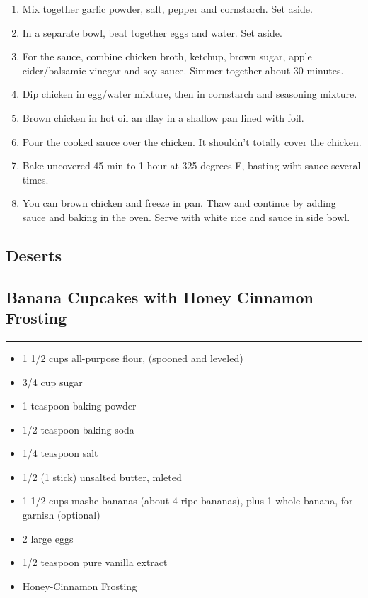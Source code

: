 \documentclass{article}
\begin{document}
\begin{enumerate}
    \item 
        Mix together garlic powder, salt, pepper and cornstarch. Set aside.
    \item 
        In a separate bowl, beat together eggs and water. Set aside.
    \item  
        For the sauce, combine chicken broth, ketchup, brown sugar, apple cider/balsamic vinegar and soy sauce. Simmer together about 30 minutes.
    \item 
        Dip chicken in egg/water mixture, then in cornstarch and seasoning mixture.
    \item 
        Brown chicken in hot oil an dlay in a shallow pan lined with foil.
    \item 
        Pour the cooked sauce over the chicken. It shouldn't totally cover the chicken.
    \item 
        Bake uncovered 45 min to 1 hour at 325 degrees F, basting wiht sauce several times.
    \item 
        You can brown chicken and freeze in pan. Thaw and continue by adding sauce and baking in the oven. Serve with white rice and sauce in side bowl.
\end{enumerate}
\newpage

\vspace*{\fill}
\begin{center}
    \section{Deserts}
\end{center}
\vspace*{\fill}
\newpage

\subsection{Banana Cupcakes with Honey Cinnamon Frosting} 
\noindent\rule[0.5ex]{\linewidth}{1pt}

\begin{framed}
    \begin{itemize}
        \item 1 1/2 cups all-purpose flour, (spooned and leveled)
        \item 3/4 cup sugar
        \item 1 teaspoon baking powder
        \item 1/2 teaspoon baking soda
        \item 1/4 teaspoon salt
        \item 1/2 (1 stick) unsalted butter, mleted
        \item 1 1/2 cups mashe bananas (about 4 ripe bananas), plus 1 whole banana, for garnish (optional)
        \item 2 large eggs
        \item 1/2 teaspoon pure vanilla extract
        \item Honey-Cinnamon Frosting
    \end{itemize}
\end{framed}
\end{document}
